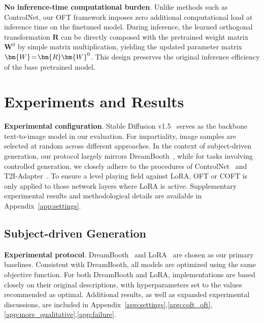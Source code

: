 \textbf{No inference-time computational burden}. Unlike methods such as ControlNet, our OFT framework imposes zero additional computational load at inference time on the finetuned model. During inference, the learned orthogonal transformation $\bm{R}$ can be directly composed with the pretrained weight matrix $\bm{W}^0$ by simple matrix multiplication, yielding the updated parameter matrix $\thickmuskip=2mu \medmuskip=2mu \bm{W}=\bm{R}\bm{W}^0$. This design preserves the original inference efficiency of the base pretrained model.

\section{Experiments and Results}

\textbf{Experimental configuration}. Stable Diffusion v1.5~\cite{rombach2022high} serves as the backbone text-to-image model in our evaluation. For impartiality, image samples are selected at random across different approaches. In the context of subject-driven generation, our protocol largely mirrors DreamBooth~\cite{ruiz2023dreambooth}, while for tasks involving controlled generation, we closely adhere to the procedures of ControlNet~\cite{zhang2023adding} and T2I-Adapter~\cite{mou2023t2i}. To ensure a level playing field against LoRA, OFT or COFT is only applied to those network layers where LoRA is active. Supplementary experimental results and methodological details are available in Appendix~\ref{app:settings}.

\subsection{Subject-driven Generation}

\textbf{Experimental protocol}. DreamBooth~\cite{ruiz2023dreambooth} and LoRA~\cite{hulora2022} are chosen as our primary baselines. Consistent with DreamBooth, all models are optimized using the same objective function. For both DreamBooth and LoRA, implementations are based closely on their original descriptions, with hyperparameters set to the values recommended as optimal. Additional results, as well as expanded experimental discussions, are included in Appendix~\ref{app:settings},\ref{app:coft_oft},\ref{app:more_qualitative},\ref{app:failure}.

